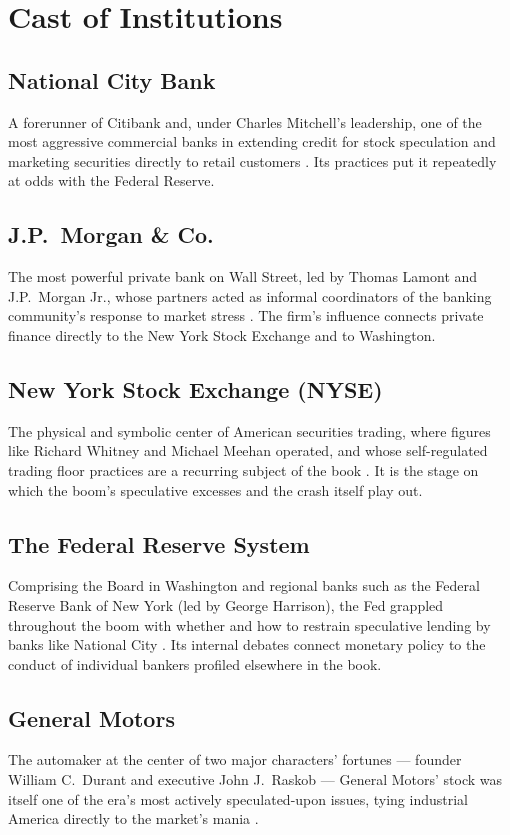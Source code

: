 \documentclass[11pt]{article}
\begin{document}
\section{Cast of Institutions}

\subsection{National City Bank}
A forerunner of Citibank and, under Charles Mitchell's leadership, one of the most
aggressive commercial banks in extending credit for stock speculation and marketing
securities directly to retail customers \autocite{airmail1929,supersummary1929}. Its
practices put it repeatedly at odds with the Federal Reserve.

\subsection{J.P.\ Morgan \& Co.}
The most powerful private bank on Wall Street, led by Thomas Lamont and J.P.\ Morgan
Jr., whose partners acted as informal coordinators of the banking community's
response to market stress \autocite{supersummary1929}. The firm's influence
connects private finance directly to the New York Stock Exchange and to Washington.

\subsection{New York Stock Exchange (NYSE)}
The physical and symbolic center of American securities trading, where figures like
Richard Whitney and Michael Meehan operated, and whose self-regulated trading floor
practices are a recurring subject of the book \autocite{supersummary1929}. It is the
stage on which the boom's speculative excesses and the crash itself play out.

\subsection{The Federal Reserve System}
Comprising the Board in Washington and regional banks such as the Federal Reserve
Bank of New York (led by George Harrison), the Fed grappled throughout the boom with
whether and how to restrain speculative lending by banks like National City
\autocite{supersummary1929}. Its internal debates connect monetary policy to the
conduct of individual bankers profiled elsewhere in the book.

\subsection{General Motors}
The automaker at the center of two major characters' fortunes --- founder William C.\
Durant and executive John J.\ Raskob --- General Motors' stock was itself one of the
era's most actively speculated-upon issues, tying industrial America directly to the
market's mania \autocite{supersummary1929}.
\end{document}
